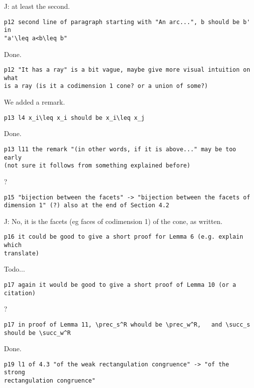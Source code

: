 \documentclass{article}
\begin{document}
J: at least the second.

\begin{verbatim}
p12 second line of paragraph starting with "An arc...", b should be b' in 
"a'\leq a<b\leq b" 
\end{verbatim}

Done.

\begin{verbatim}
p12 "It has a ray" is a bit vague, maybe give more visual intuition on what 
is a ray (is it a codimension 1 cone? or a union of some?)
\end{verbatim}

We added a remark.

\begin{verbatim}
p13 l4 x_i\leq x_i should be x_i\leq x_j
\end{verbatim}

Done.

\begin{verbatim}
p13 l11 the remark "(in other words, if it is above..." may be too early 
(not sure it follows from something explained before)
\end{verbatim}

?

\begin{verbatim}
p15 "bijection between the facets" -> "bijection between the facets of 
dimension 1" (?) also at the end of Section 4.2
\end{verbatim}

J: No, it is the facets (eg faces of codimension 1) of the cone, as written.

\begin{verbatim}
p16 it could be good to give a short proof for Lemma 6 (e.g. explain which 
translate)
\end{verbatim}

Todo...

\begin{verbatim}
p17 again it would be good to give a short proof of Lemma 10 (or a citation)
\end{verbatim}

?

\begin{verbatim}
p17 in proof of Lemma 11, \prec_s^R whould be \prec_w^R,   and \succ_s 
should be \succ_w^R
\end{verbatim}

Done.

\begin{verbatim}
p19 l1 of 4.3 "of the weak rectangulation congruence" -> "of the strong 
rectangulation congruence"
\end{verbatim}
\end{document}
